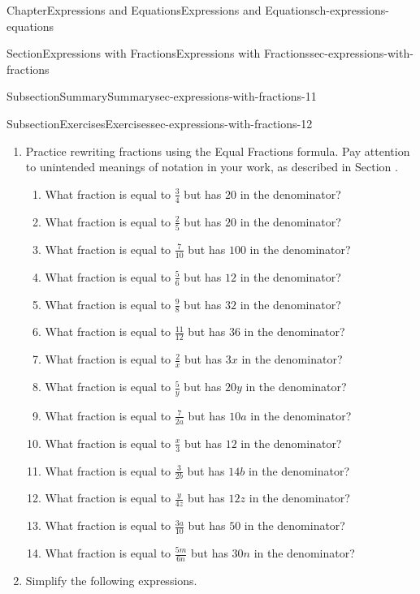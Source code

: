 \documentclass[twoside,11pt,]{book}
\numberwithin{equation}{chapter}
\begin{document}
\begin{chapterptx}{Chapter}{Expressions and Equations}{}{Expressions and Equations}{}{}{ch-expressions-equations}
\begin{sectionptx}{Section}{Expressions with Fractions}{}{Expressions with Fractions}{}{}{sec-expressions-with-fractions}
\begin{subsectionptx}{Subsection}{Summary}{}{Summary}{}{}{sec-expressions-with-fractions-11}
\begin{enumerate}
\end{enumerate}
%
\end{subsectionptx}
%
%
\typeout{************************************************}
\typeout{************************************************}
%
\begin{subsectionptx}{Subsection}{Exercises}{}{Exercises}{}{}{sec-expressions-with-fractions-12}
%
\begin{enumerate}
\item\hypertarget{practice-fraction-equal-values}{}Practice rewriting fractions using the Equal Fractions formula. Pay attention to unintended meanings of notation in your work, as described in Section .%
\begin{enumerate}
\item{}What fraction is equal to \(\frac{3}{4}\) but has \(20\) in the denominator?%
\item{}What fraction is equal to \(\frac{2}{5}\) but has \(20\) in the denominator?%
\item{}What fraction is equal to \(\frac{7}{10}\) but has \(100\) in the denominator?%
\item{}What fraction is equal to \(\frac{5}{6}\) but has \(12\) in the denominator?%
\item{}What fraction is equal to \(\frac{9}{8}\) but has \(32\) in the denominator?%
\item{}What fraction is equal to \(\frac{11}{12}\) but has \(36\) in the denominator?%
\item{}What fraction is equal to \(\frac{2}{x}\) but has \(3x\) in the denominator?%
\item{}What fraction is equal to \(\frac{5}{y}\) but has \(20y\) in the denominator?%
\item{}What fraction is equal to \(\frac{7}{2a}\) but has \(10a\) in the denominator?%
\item{}What fraction is equal to \(\frac{x}{3}\) but has \(12\) in the denominator?%
\item{}What fraction is equal to \(\frac{3}{2b}\) but has \(14b\) in the denominator?%
\item{}What fraction is equal to \(\frac{y}{4z}\) but has \(12z\) in the denominator?%
\item{}What fraction is equal to \(\frac{3a}{10}\) but has \(50\) in the denominator?%
\item{}What fraction is equal to \(\frac{5m}{6n}\) but has \(30n\) in the denominator?%
\end{enumerate}
%
\item\hypertarget{practice-simplifying-expressions-with-fractions}{}Simplify the following expressions.%

\end{enumerate}
\end{subsectionptx}
\end{sectionptx}
\end{chapterptx}
\end{document}
